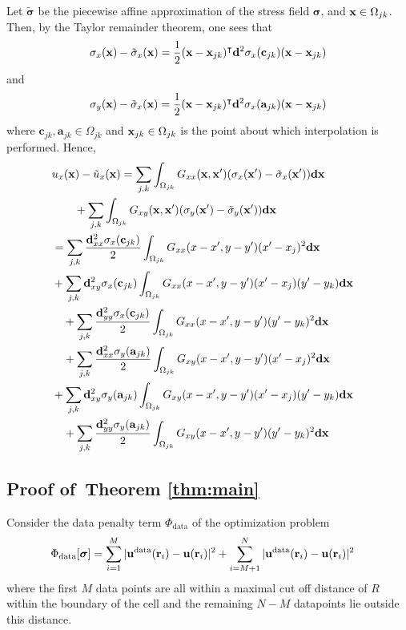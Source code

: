 \documentclass[aps,prl,reprint,twocolumn,groupedaddress,showpacs]{revtex4-1}
\newcommand{\bsigma}{{\boldsymbol\sigma}}
\def\d{{\bf d}}
\def\r{{\bf r}}
\def\u{{\bf u}}
\def\x{{\bf x}}
\newcommand{\bs}{\boldsymbol{\sigma}}
\begin{document}
Let $\tilde{\bsigma}$ be the piecewise affine approximation of the stress field $\bsigma$, and $\x\in\Omega_{jk}$. Then,
by the Taylor remainder theorem, one sees that
$$
\sigma_{x}(\x) - \tilde{\sigma}_x(\x) = \frac{1}{2}(\x-\x_{jk})^\intercal\d^2\sigma_{x}(\mathbf{c}_{jk})(\x-\x_{jk})
$$
and
$$
\sigma_{y}(\x) - \tilde{\sigma}_x(\x) = \frac{1}{2}(\x-\x_{jk})^\intercal\d^2\sigma_{x}(\mathbf{a}_{jk})(\x-\x_{jk})
$$
where $\mathbf{c}_{jk},\mathbf{a}_{jk}\in\Omega_{jk}$ and $\x_{jk}\in\Omega_{jk}$ is the point about which interpolation is performed.
Hence,
\begin{align}
\lefteqn{u_x(\x) - \tilde{u}_x(\x)  = \sum_{j,k}\int_{\Omega_{jk}} G_{xx} (\x,\x')(\sigma_{x}(\x') - \tilde{\sigma}_x(\x')) \d\x } \nonumber\\
&\qquad+\sum_{j,k}\int_{\Omega_{jk}} G_{xy} (\x,\x')(\sigma_{y}(\x') - \tilde{\sigma}_y(\x')) \d\x \nonumber\\
&= \sum_{j,k} \frac{\d_{xx}^2\sigma_x(\mathbf{c}_{jk})}{2}\int_{\Omega_{jk}} G_{xx}(x-x',y-y')  (x'-x_j)^2 \d\x \nonumber\\
&  + \sum_{j,k} {\d_{xy}^2\sigma_x(\mathbf{c}_{jk})}\int_{\Omega_{jk}} G_{xx}(x-x',y-y')  (x'-x_j)(y'-y_k)\d\x \nonumber\\
&\quad + \sum_{j,k} \frac{\d_{yy}^2\sigma_x(\mathbf{c}_{jk})}{2}\int_{\Omega_{jk}} G_{xx}(x-x',y-y')  (y'-y_k)^2\d\x \nonumber\\
&\quad + \sum_{j,k} \frac{\d_{xx}^2\sigma_y(\mathbf{a}_{jk})}{2}\int_{\Omega_{jk}} G_{xy}(x-x',y-y')  (x'-x_j)^2\d\x \nonumber\\
&  + \sum_{j,k} {\d_{xy}^2\sigma_y(\mathbf{a}_{jk})}\int_{\Omega_{jk}} G_{xy}(x-x',y-y')  (x'-x_j)(y'-y_k)\d\x \nonumber\\
&\quad + \sum_{j,k} \frac{\d_{yy}^2\sigma_y(\mathbf{a}_{jk})}{2}\int_{\Omega_{jk}} G_{xy}(x-x',y-y')  (y'-y_k)^2\d\x 
\end{align}

\subsection{Proof of~Theorem \ref{thm:main}}

Consider the data penalty term $\Phi_{\textrm{data}}$ of the optimization problem
\begin{align*}
\Phi_{\rm data}[\bs] &=\sum_{i=1}^{M}\vert \u^{\rm
  data}(\r_{i})- \u(\r_i)\vert^{2}  + \sum_{i=M+1}^{N}\vert \u^{\rm
  data}(\r_{i})- \u(\r_i)\vert^{2} 
\end{align*}
where the first $M$ data points are all within a maximal cut off distance of $R$ within the boundary of the cell and the remaining $N-M$ datapoints lie outside this distance.

\end{document}
